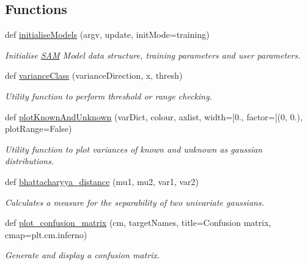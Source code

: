 \subsection*{Functions}
\begin{DoxyCompactItemize}
\item 
def \hyperlink{group__icubclient__SAM__utils_ga7d1d61b09b614680e853bc0be5e10df1}{initialise\+Models} (argv, update, init\+Mode=\textquotesingle{}training\textquotesingle{})
\begin{DoxyCompactList}\small\item\em Initialise \hyperlink{namespaceSAM}{S\+AM} Model data structure, training parameters and user parameters. \end{DoxyCompactList}\item 
def \hyperlink{group__icubclient__SAM__utils_ga27bd9bc8ab5b70ae2f6cc18857afc88c}{variance\+Class} (variance\+Direction, x, thresh)
\begin{DoxyCompactList}\small\item\em Utility function to perform threshold or range checking. \end{DoxyCompactList}\item 
def \hyperlink{group__icubclient__SAM__utils_ga1626d58a716c5b4794ff6f6933011076}{plot\+Known\+And\+Unknown} (var\+Dict, colour, axlist, width=\mbox{[}0., factor=\mbox{[}(0, 0.), plot\+Range=False)
\begin{DoxyCompactList}\small\item\em Utility function to plot variances of known and unknown as gaussian distributions. \end{DoxyCompactList}\item 
def \hyperlink{group__icubclient__SAM__utils_gafede13612da64cc2471be35b385972ed}{bhattacharyya\+\_\+distance} (mu1, mu2, var1, var2)
\begin{DoxyCompactList}\small\item\em Calculates a measure for the separability of two univariate gaussians. \end{DoxyCompactList}\item 
def \hyperlink{group__icubclient__SAM__utils_gae515125ab69f88f48f48b3eb766927a1}{plot\+\_\+confusion\+\_\+matrix} (cm, target\+Names, title=\textquotesingle{}Confusion matrix\textquotesingle{}, cmap=plt.\+cm.\+inferno)
\begin{DoxyCompactList}\small\item\em Generate and display a confusion matrix. \end{DoxyCompactList}\item 

\end{DoxyCompactItemize}
